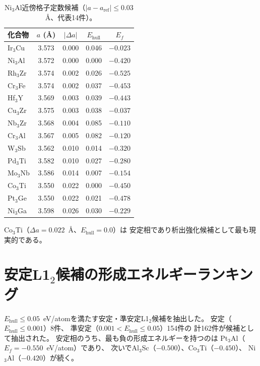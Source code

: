 \documentclass[5p,twocolumn]{elsarticle}
\begin{document}
\begin{table}[htbp]
  \centering
  \caption{Ni$_3$Al近傍格子定数候補（$|a - a_{\text{ref}}| \leq 0.03$~\AA、代表14件）。}
  \label{tab:sup_lattice_match}
  \small
  \begin{tabular}{lcccc}
    \toprule
    化合物 & $a$ (\AA) & $|\Delta a|$ & $E_\text{hull}$ & $E_f$ \\
    \midrule
    Ir$_3$Cu & 3.573 & 0.000 & 0.046 & $-0.023$ \\
    Ni$_3$Al & 3.572 & 0.000 & 0.000 & $-0.420$ \\
    Rh$_3$Zr & 3.574 & 0.002 & 0.026 & $-0.525$ \\
    Cr$_3$Fe & 3.574 & 0.002 & 0.037 & $-0.453$ \\
    Hf$_3$Y & 3.569 & 0.003 & 0.039 & $-0.443$ \\
    Cu$_3$Zr & 3.575 & 0.003 & 0.038 & $-0.037$ \\
    Nb$_3$Zr & 3.568 & 0.004 & 0.085 & $-0.110$ \\
    Cr$_3$Al & 3.567 & 0.005 & 0.082 & $-0.120$ \\
    W$_3$Sb & 3.562 & 0.010 & 0.014 & $-0.320$ \\
    Pd$_3$Ti & 3.582 & 0.010 & 0.027 & $-0.280$ \\
    Mo$_3$Nb & 3.586 & 0.014 & 0.007 & $-0.154$ \\
    Co$_3$Ti & 3.550 & 0.022 & 0.000 & $-0.450$ \\
    Pt$_3$Ge & 3.550 & 0.022 & 0.021 & $-0.478$ \\
    Ni$_3$Ga & 3.598 & 0.026 & 0.030 & $-0.229$ \\
    \bottomrule
  \end{tabular}
\end{table}

Co$_3$Ti（$\Delta a = 0.022$~\AA、$E_\text{hull} = 0.0$）は
安定相であり析出強化候補として最も現実的である。

\section{安定L1$_2$候補の形成エネルギーランキング}
\label{sec:sup_stable_l12}

$E_\text{hull} \leq 0.05$~eV/atomを満たす安定・準安定L1$_2$候補を抽出した。
安定（$E_\text{hull} \leq 0.001$）8件、
準安定（$0.001 < E_\text{hull} \leq 0.05$）154件の
計162件が候補として抽出された。
安定相のうち、最も負の形成エネルギーを持つのは
Pt$_3$Al（$E_f = -0.550$~eV/atom）であり、
次いでAl$_3$Sc（$-0.500$）、Co$_3$Ti（$-0.450$）、
Ni$_3$Al（$-0.420$）が続く。
\end{document}
